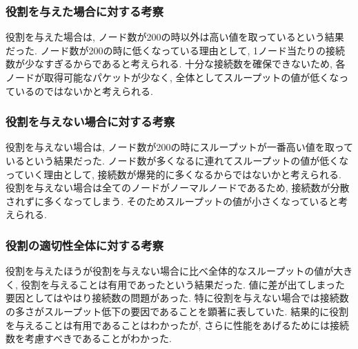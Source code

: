 \subsubsection{役割を与えた場合に対する考察}
役割を与えた場合は, ノード数が200の時以外は高い値を取っているという結果だった. ノード数が200の時に低くなっている理由として, 1ノード当たりの接続数が少なすぎるからであると考えられる. 十分な接続数を確保できないため, 各ノードが取得可能なパケットが少なく, 全体としてスループットの値が低くなっているのではないかと考えられる.

\subsubsection{役割を与えない場合に対する考察}
役割を与えない場合は, ノード数が200の時にスループットが一番高い値を取っているという結果だった. ノード数が多くなるに連れてスループットの値が低くなっていく理由として, 接続数が爆発的に多くなるからではないかと考えられる. 役割を与えない場合は全てのノードがノーマルノードであるため, 接続数が分散されずに多くなってしまう. そのためスループットの値が小さくなっていると考えられる.

\subsubsection{役割の適切性全体に対する考察}
役割を与えたほうが役割を与えない場合に比べ全体的なスループットの値が大きく, 役割を与えることは有用であったという結果だった. 値に差が出てしまった要因としてはやはり接続数の問題があった. 特に役割を与えない場合では接続数の多さがスループット低下の要因であることを顕著に表していた. 結果的に役割を与えることは有用であることはわかったが, さらに性能をあげるためには接続数を考慮すべきであることがわかった.
